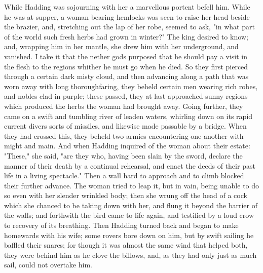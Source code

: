 \documentclass[10pt,a4paper]{report}
\begin{document}
While Hadding was sojourning with her a marvellous portent befell him. While he was at supper, a woman bearing hemlocks was seen to raise her head beside the brazier, and, stretching out the lap of her robe, seemed to ask, "in what part of the world such fresh herbs had grown in winter?" The king desired to know; and, wrapping him in her mantle, she drew him with her underground, and vanished. I take it that the nether gods purposed that he should pay a visit in the flesh to the regions whither he must go when he died. So they first pierced through a certain dark misty cloud, and then advancing along a path that was worn away with long thoroughfaring, they beheld certain men wearing rich robes, and nobles clad in purple; these passed, they at last approached sunny regions which produced the herbs the woman had brought away. Going further, they came on a swift and tumbling river of leaden waters, whirling down on its rapid current divers sorts of missiles, and likewise made passable by a bridge. When they had crossed this, they beheld two armies encountering one another with might and main. And when Hadding inquired of the woman about their estate: "These," she said, "are they who, having been slain by the sword, declare the manner of their death by a continual rehearsal, and enact the deeds of their past life in a living spectacle." Then a wall hard to approach and to climb blocked their further advance. The woman tried to leap it, but in vain, being unable to do so even with her slender wrinkled body; then she wrung off the head of a cock which she chanced to be taking down with her, and flung it beyond the barrier of the walls; and forthwith the bird came to life again, and testified by a loud crow to recovery of its breathing. Then Hadding turned back and began to make homewards with his wife; some rovers bore down on him, but by swift sailing he baffled their snares; for though it was almost the same wind that helped both, they were behind him as he clove the billows, and, as they had only just as much sail, could not overtake him.\\
\end{document}
